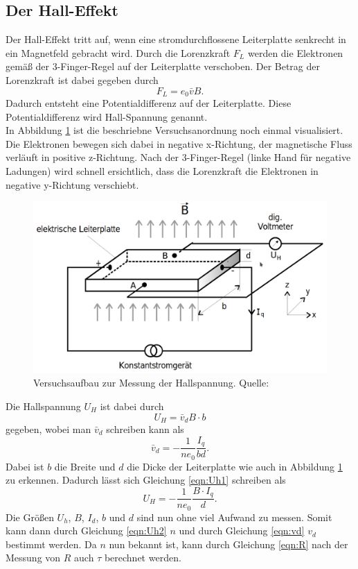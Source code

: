\subsection{Der Hall-Effekt}
Der Hall-Effekt tritt auf, wenn eine stromdurchflossene Leiterplatte senkrecht in ein Magnetfeld
gebracht wird. Durch die Lorenzkraft $F_L$ werden die Elektronen gemäß der 3-Finger-Regel auf der Leiterplatte
verschoben. Der Betrag der Lorenzkraft ist dabei gegeben durch
\begin{equation*}
    F_L=e_0\bar{v}B.
\end{equation*}
Dadurch entsteht eine Potentialdifferenz auf der Leiterplatte. Diese Potentialdifferenz wird
Hall-Spannung genannt. \\
In Abbildung \ref{fig:Hall} ist die beschriebne Versuchsanordnung noch einmal visualisiert.
Die Elektronen bewegen sich dabei in negative x-Richtung, der magnetische Fluss verläuft in positive z-Richtung.
Nach der 3-Finger-Regel (linke Hand für negative Ladungen) wird schnell ersichtlich, dass die Lorenzkraft die
Elektronen in negative y-Richtung verschiebt.
%
\begin{figure}[H]
    \centering
    \includegraphics[scale = 0.3]{content/1Hall.png}
    \caption{Versuchsaufbau zur Messung der Hallspannung. Quelle: \cite{AP01}}
    \label{fig:Hall}
  \end{figure}
%
\noindent Die Hallspannung $U_H$ ist dabei durch
\begin{equation}
    U_H=\bar{v}_dB\cdot b \label{eqn:Uh1}
\end{equation}
gegeben, wobei man $\bar{v}_d$ schreiben kann als
\begin{equation}
    \bar{v}_d=-\frac{1}{ne_0}\frac{I_q}{bd}. \label{eqn:vd}
\end{equation}
Dabei ist $b$ die Breite und $d$ die Dicke der Leiterplatte wie auch in Abbildung \ref{fig:Hall} zu erkennen.
Dadurch lässt sich Gleichung \eqref{eqn:Uh1} schreiben als
\begin{equation}
    U_H=-\frac{1}{ne_0}\frac{B\cdot I_q}{d}. \label{eqn:Uh2}
\end{equation}
Die Größen $U_h$, $B$, $I_d$, $b$ und $d$ sind nun ohne viel Aufwand zu messen. Somit kann dann durch
Gleichung \ref{eqn:Uh2} $n$ und durch Gleichung \ref{eqn:vd} $v_d$ bestimmt werden. Da $n$ nun bekannt ist,
kann durch Gleichung \ref{eqn:R} nach der Messung von $R$ auch $\tau$ berechnet werden.\\
